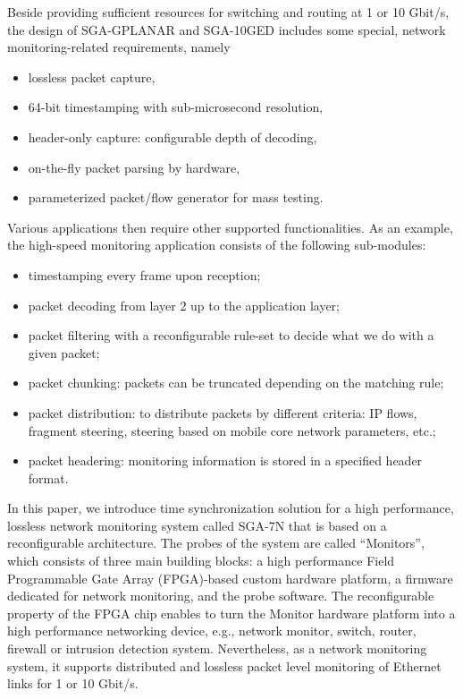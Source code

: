 \documentclass[journal]{IEEEtran}
\begin{document}
Beside providing sufficient resources for switching and routing at 1 or 10 Gbit/s, the design of SGA-GPLANAR \cite{GPLANAR} and SGA-10GED \cite{10GED} includes some special, network monitoring-related requirements, namely 
\begin{itemize}
\renewcommand\labelitemi{--}
\item lossless packet capture,
\item 64-bit timestamping with sub-microsecond resolution,
\item header-only capture: configurable depth of decoding,
\item on-the-fly packet parsing by hardware,
\item parameterized packet/flow generator for mass testing.
\end{itemize}

Various applications then require other supported functionalities. As an example,
the high-speed monitoring application consists of the following sub-modules:
\begin{itemize}
\renewcommand\labelitemi{--}
\item timestamping every frame upon reception;
\item packet decoding from layer 2  up to the application layer;
\item packet filtering with a reconfigurable rule-set to decide what we do with a given packet;
\item packet chunking: packets can be truncated depending on the matching rule;
\item packet distribution: to distribute packets by different criteria: IP flows, fragment steering, steering based on mobile core network parameters, etc.;
\item packet headering: monitoring information is stored in a specified header format.
\end{itemize}

In this paper, we introduce time synchronization solution for a high performance, lossless network monitoring system called SGA-7N that is based on a reconfigurable architecture. The probes of the system are called ``Monitors'', which consists of three main building blocks: a high performance Field Programmable Gate Array (FPGA)-based custom hardware platform, a firmware dedicated for network monitoring, and the probe software. The reconfigurable property of the FPGA chip enables to turn the Monitor hardware platform into a high performance networking device, e.g., network monitor, switch, router, firewall or intrusion detection system. Nevertheless, as a network monitoring system, it supports distributed and lossless packet level monitoring of Ethernet links for 1 or 10 Gbit/s.
\end{document}
